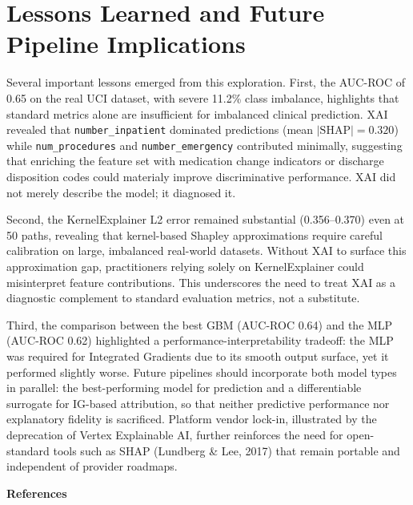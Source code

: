 \documentclass[12pt,letterpaper]{article}
\begin{document}
\section{Lessons Learned and Future Pipeline Implications}

Several important lessons emerged from this exploration. First, the AUC-ROC of
0.65 on the real UCI dataset, with severe 11.2\% class imbalance, highlights
that standard metrics alone are insufficient for imbalanced clinical prediction.
XAI revealed that \texttt{number\_inpatient} dominated predictions (mean
$|\text{SHAP}| = 0.320$) while \texttt{num\_procedures} and
\texttt{number\_emergency} contributed minimally, suggesting that enriching the
feature set with medication change indicators or discharge disposition codes could
materialy improve discriminative performance. XAI did not merely describe the
model; it diagnosed it.

Second, the KernelExplainer L2 error remained substantial (0.356--0.370) even
at 50 paths, revealing that kernel-based Shapley approximations require careful
calibration on large, imbalanced real-world datasets. Without XAI to surface
this approximation gap, practitioners relying solely on KernelExplainer could
misinterpret feature contributions. This underscores the need to treat XAI as a
diagnostic complement to standard evaluation metrics, not a substitute.

Third, the comparison between the best GBM (AUC-ROC 0.64) and the MLP (AUC-ROC 0.62)
highlighted a performance-interpretability tradeoff: the MLP was required for
Integrated Gradients due to its smooth output surface, yet it performed slightly
worse. Future pipelines should incorporate both model types in parallel: the
best-performing model for prediction and a differentiable surrogate for
IG-based attribution, so that neither predictive performance nor explanatory
fidelity is sacrificed. Platform vendor lock-in, illustrated by the deprecation
of Vertex Explainable AI, further reinforces the need for open-standard tools
such as SHAP (Lundberg \& Lee, 2017) that remain portable and independent of
provider roadmaps.

\newpage

\noindent\textbf{References}

\begingroup
\singlespacing
\setlength{\parindent}{-0.5in}
\setlength{\leftskip}{0.5in}
\setlength{\parskip}{10pt}
\setlength{\emergencystretch}{3em}   %
\end{document}
